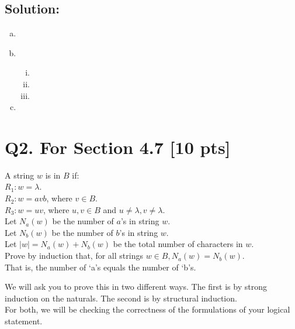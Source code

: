 \documentclass[12pt]{article}
\begin{document}
\subsection*{\textbf{Solution:}}

\begin{enumerate}[(a)]
    \item  
    \item \ 
        \begin{enumerate}[(i)]
            \item 
            \item 
            \item 
        \end{enumerate}
    \item 
\end{enumerate}

\newpage

\newpage

\section*{\textbf{Q2. For Section 4.7} [10 pts]}


 \noindent A string $w$ is in $B$ if: \\
 \noindent $R_1: w = \lambda.$\\
 $R_2: w = avb$, where $v \in B.$\\
 $R_3: w = uv$, where $u, v \in B$ and $u \neq \lambda, v \neq \lambda.$ \\

 \noindent Let $N_a(w)$ be the number of $a$'s in string $w$.\\
 Let $N_b(w)$ be the number of $b$'s in string $w$.\\
 Let $|w| = N_a(w) + N_b(w)$ be the total number of characters in $w$.\\

 \noindent Prove by induction that, for all strings $w \in B, N_a(w) = N_b(w).$\\ 
 That is, the number of `a's equals the number of `b's.

 \medskip
 
 We will ask you to prove this in two different ways.  The first is by strong induction on the naturals.  The second is by structural induction. \\

 \noindent For both, we will be checking the correctness of the formulations of your logical statement.
 
\end{document}
